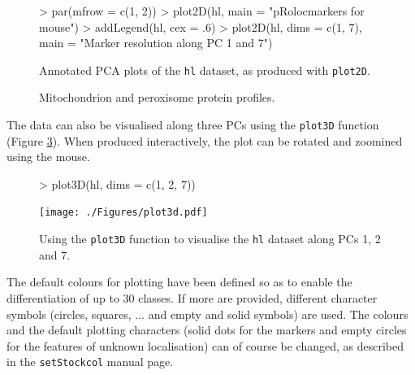 \begin{figure}[!ht]
  \centering
\begin{Schunk}
\begin{Sinput}
> par(mfrow = c(1, 2))
> plot2D(hl, main = "pRolocmarkers for mouse")
> addLegend(hl, cex = .6)
> plot2D(hl, dims = c(1, 7), main = "Marker resolution along PC 1 and 7")
\end{Sinput}
\end{Schunk}
\caption{Annotated PCA plots of the \texttt{hl} dataset, as produced
  with \texttt{plot2D}.}
  \label{fig:plotmarkers}
\end{figure}


\begin{figure}[!ht]
  \centering
\begin{Schunk}
\end{Schunk}
  \caption{Mitochondrion and peroxisome protein profiles.}
  \label{fig:plotDist2}
\end{figure}


The data can also be visualised along three PCs using the
\texttt{plot3D} function (Figure \ref{fig:plotmarkers3d}). When
produced interactively, the plot can be rotated and zoomined using the
mouse.

\begin{figure}[htb]
  \centering
\begin{Schunk}
\begin{Sinput}
> plot3D(hl, dims = c(1, 2, 7))
\end{Sinput}
\end{Schunk}
  \texttt{[image: ./Figures/plot3d.pdf]}
  \caption{Using the \texttt{plot3D} function to visualise the
    \texttt{hl} dataset along PCs 1, 2 and 7. }
  \label{fig:plotmarkers3d}
\end{figure}

The default colours for plotting have been defined so as to enable the
differentiation of up to 30 classes. If more are provided, different
character symbols (circles, squares, ... and empty and solid symbols)
are used. The colours and the default plotting characters (solid dots
for the markers and empty circles for the features of unknown
localisation) can of course be changed, as described in the
\texttt{setStockcol} manual page.

